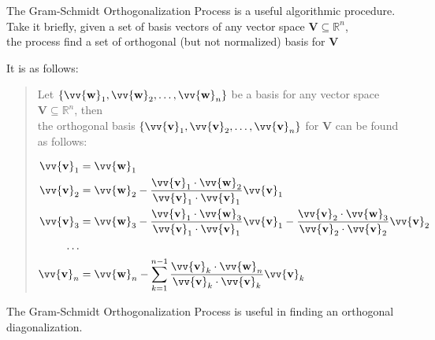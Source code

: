 \documentclass[11pt]{article}
\DeclareRobustCommand{\myvec}[1]{\vv{\mathbf{#1}}}
\newcommand{\mysubvecsp}[1]{\bm{{#1}}}
\newcommand{\dotprod}[2]{#1 \cdot #2}
\begin{document}
    The Gram-Schmidt Orthogonalization Process is a useful algorithmic procedure.
    \\
    Take it briefly, given a set of basis vectors of any vector space $\mysubvecsp{V} \subseteq \mathbb{R}^n$,\\
    \quad the process find a set of orthogonal (but not normalized) basis for $\mysubvecsp{V}$ \vspace{1ex}
    
    It is as follows:
    \begin{quote}
        Let $\{\myvec{w}_1, \myvec{w}_2, \dots, \myvec{w}_n\}$ be a basis for any vector space $\mysubvecsp{V} \subseteq \mathbb{R}^n$, then\\
        the orthogonal basis $\{\myvec{v}_1, \myvec{v}_2, \dots, \myvec{v}_n\}$ for $\mysubvecsp{V}$ can be found as follows:
    
        \begin{align*}
            \myvec{v}_1 &= \myvec{w}_1 \\
            \myvec{v}_2 &= \myvec{w}_2 - \frac{\dotprod{\myvec{v}_1}{\myvec{w}_2}}{\dotprod{\myvec{v}_1}{\myvec{v}_1}}\myvec{v}_1 \\
            \myvec{v}_3 &= \myvec{w}_3 - \frac{\dotprod{\myvec{v}_1}{\myvec{w}_3}}{\dotprod{\myvec{v}_1}{\myvec{v}_1}}\myvec{v}_1 - \frac{\dotprod{\myvec{v}_2}{\myvec{w}_3}}{\dotprod{\myvec{v}_2}{\myvec{v}_2}}\myvec{v}_2 \\
            \dots \\
            \myvec{v}_n &= \myvec{w}_n - \sum_{k = 1}^{n-1} \frac{\dotprod{\myvec{v}_k}{\myvec{w}_n}}{\dotprod{\myvec{v}_k}{\myvec{v}_k}}\myvec{v}_k \\
        \end{align*}
    \end{quote}
    The Gram-Schmidt Orthogonalization Process is useful in finding an orthogonal diagonalization.
    
\end{document}
